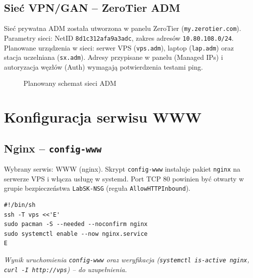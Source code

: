 \documentclass[a4paper,10pt]{article}
\begin{document}
\subsection{Sieć VPN/GAN -- ZeroTier ADM}

Sieć prywatna ADM została utworzona w panelu ZeroTier
(\texttt{my.zerotier.com}). Parametry sieci: NetID \texttt{8d1c312afa9a3adc},
zakres adresów \texttt{10.80.108.0/24}. Planowane urządzenia w sieci:
serwer VPS (\texttt{vps.adm}), laptop (\texttt{lap.adm}) oraz stacja uczelniana
(\texttt{sx.adm}). Adresy przypisane w panelu (Managed IPs) i autoryzacja
węzłów (Auth) wymagają potwierdzenia testami ping.

\begin{figure}[H]
  \centering
  
  \caption{Planowany schemat sieci ADM}
\end{figure}


\section{Konfiguracja serwisu WWW}

\subsection{Nginx -- \texttt{config-www}}

Wybrany serwis: WWW (nginx). Skrypt \texttt{config-www} instaluje pakiet
\texttt{nginx} na serwerze VPS i włącza usługę w systemd.
Port TCP 80 powinien być otwarty w grupie bezpieczeństwa \texttt{LabSK-NSG}
(reguła \texttt{AllowHTTPInbound}).

\begin{lstlisting}
#!/bin/sh
ssh -T vps <<'E'
sudo pacman -S --needed --noconfirm nginx
sudo systemctl enable --now nginx.service
E
\end{lstlisting}

\textit{Wynik uruchomienia \texttt{config-www} oraz weryfikacja
(\texttt{systemctl is-active nginx}, \texttt{curl -I http://vps}) -- do uzupełnienia.}
\end{document}
